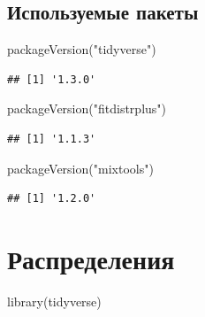 \documentclass[
]{book}
\newenvironment{Shaded}{\begin{snugshade}}{\end{snugshade}}
\newcommand{\FunctionTok}[1]{\textcolor[rgb]{0.00,0.00,0.00}{#1}}
\newcommand{\NormalTok}[1]{#1}
\newcommand{\StringTok}[1]{\textcolor[rgb]{0.31,0.60,0.02}{#1}}
\begin{document}
\hypertarget{ux438ux441ux43fux43eux43bux44cux437ux443ux435ux43cux44bux435-ux43fux430ux43aux435ux442ux44b}{%
\section{Используемые пакеты}\label{ux438ux441ux43fux43eux43bux44cux437ux443ux435ux43cux44bux435-ux43fux430ux43aux435ux442ux44b}}

\begin{Shaded}
\begin{Highlighting}[]
\FunctionTok{packageVersion}\NormalTok{(}\StringTok{"tidyverse"}\NormalTok{)}
\end{Highlighting}
\end{Shaded}

\begin{verbatim}
## [1] '1.3.0'
\end{verbatim}

\begin{Shaded}
\begin{Highlighting}[]
\FunctionTok{packageVersion}\NormalTok{(}\StringTok{"fitdistrplus"}\NormalTok{)}
\end{Highlighting}
\end{Shaded}

\begin{verbatim}
## [1] '1.1.3'
\end{verbatim}

\begin{Shaded}
\begin{Highlighting}[]
\FunctionTok{packageVersion}\NormalTok{(}\StringTok{"mixtools"}\NormalTok{)}
\end{Highlighting}
\end{Shaded}

\begin{verbatim}
## [1] '1.2.0'
\end{verbatim}

\hypertarget{ux440ux430ux441ux43fux440ux435ux434ux435ux43bux435ux43dux438ux44f}{%
\chapter{Распределения}\label{ux440ux430ux441ux43fux440ux435ux434ux435ux43bux435ux43dux438ux44f}}

\begin{Shaded}
\begin{Highlighting}[]
\FunctionTok{library}\NormalTok{(tidyverse)}
\end{Highlighting}
\end{Shaded}
\end{document}

